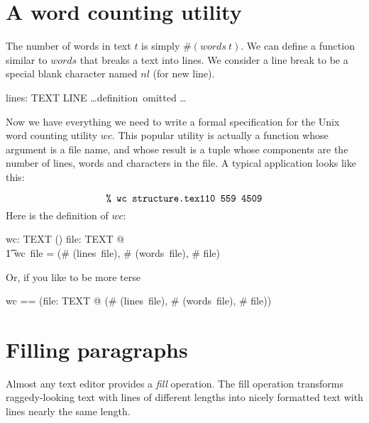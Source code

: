 \section{A word counting utility}

The number of words in text $t$ is simply $\# (words~t)$.  We can define a
function similar to $words$ that breaks a text into lines.  We consider a 
line break to be a special blank character named $nl$ (for new line).

\begin{axdef}
        lines: TEXT \fun \seq LINE
\where 
	\dots \mbox{definition omitted} \dots
\end{axdef} 
Now we have everything we need to write a formal specification for the Unix
word counting utility $wc$.  This popular utility is actually a function
whose argument is a file name, and whose result is a tuple whose components
are the number of lines, words and characters in the file.  A typical
application looks like this:

\[
\mbox{{\tt \% wc structure.tex}}\\
\mbox{{\tt 110 559 4509}}
\]
Here is the definition of $wc$:

\begin{axdef}
	wc: TEXT \fun (\nat \cross \nat \cross \nat)
\where
	\forall file: TEXT @ \\
\t1		wc~file = (\# (lines~file), \# (words~file), \# file)
\end{axdef}
Or, if you like to be more terse

\begin{zed}
   wc == (\lambda file: TEXT @ (\# (lines~file), \# (words~file), \# file))
\end{zed}

\section{Filling paragraphs}

Almost any text editor provides a {\em fill} operation.  The fill operation
transforms raggedy-looking text with lines of different lengths into
nicely formatted text with lines nearly the same length.

